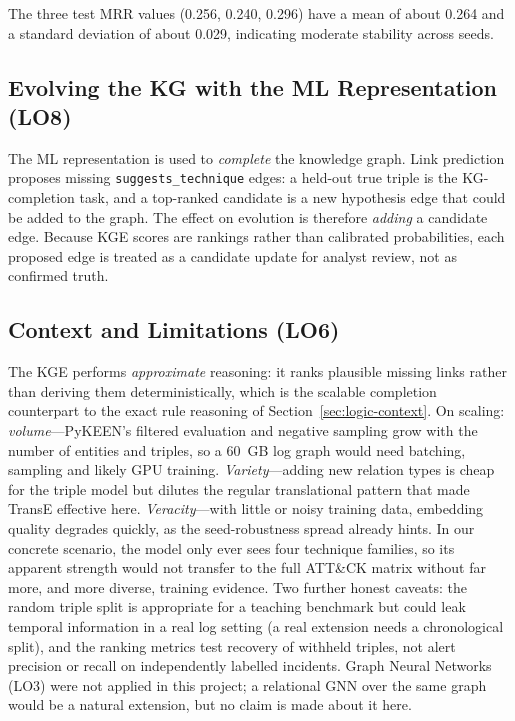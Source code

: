 \documentclass{article}
\begin{document}
The three test MRR values (0.256, 0.240, 0.296) have a mean of about 0.264 and
a standard deviation of about 0.029, indicating moderate stability across
seeds.

\subsection{Evolving the KG with the ML Representation (LO8)}
\label{sec:ml-evolution}
The ML representation is used to \emph{complete} the knowledge graph. Link
prediction proposes missing \texttt{suggests\_technique} edges: a held-out
true triple is the KG-completion task, and a top-ranked candidate is a new
hypothesis edge that could be added to the graph. The effect on evolution is
therefore \emph{adding} a candidate edge. Because KGE scores are rankings
rather than calibrated probabilities, each proposed edge is treated as a
candidate update for analyst review, not as confirmed truth.

\subsection{Context and Limitations (LO6)}
\label{sec:ml-context}
The KGE performs \emph{approximate} reasoning: it ranks plausible missing
links rather than deriving them deterministically, which is the scalable
completion counterpart to the exact rule reasoning of
Section~\ref{sec:logic-context}. On scaling: \emph{volume}---PyKEEN's filtered
evaluation and negative sampling grow with the number of entities and triples,
so a 60~GB log graph would need batching, sampling and likely GPU training.
\emph{Variety}---adding new relation types is cheap for the triple model but
dilutes the regular translational pattern that made TransE effective here.
\emph{Veracity}---with little or noisy training data, embedding quality
degrades quickly, as the seed-robustness spread already hints. In our concrete
scenario, the model only ever sees four technique families, so its apparent
strength would not transfer to the full ATT\&CK matrix without far more, and
more diverse, training evidence. Two further honest caveats: the random triple
split is appropriate for a teaching benchmark but could leak temporal
information in a real log setting (a real extension needs a chronological
split), and the ranking metrics test recovery of withheld triples, not alert
precision or recall on independently labelled incidents. Graph Neural
Networks (LO3) were not applied in this project; a relational GNN over the
same graph would be a natural extension, but no claim is made about it here.
\end{document}
